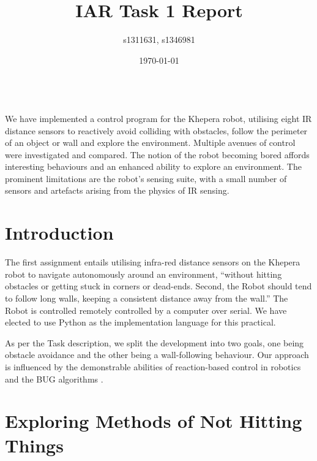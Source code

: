 \documentclass[11pt, a4paper]{article}
\renewenvironment{abstract}{%
{\mdseries\scshape\Large\abstractname}
\vspace{1em}\\
}{\par\noindent}
\begin{document}
\title{IAR Task 1 Report}
\author{s1311631, s1346981}
\date{\today}
\maketitle



\begin{abstract}
  We have implemented a control program for the Khepera robot, utilising eight IR distance
  sensors to reactively avoid colliding with obstacles, follow the perimeter of an object 
  or wall  and explore the environment. Multiple avenues of control were investigated and 
  compared. The notion of the robot becoming bored affords interesting behaviours and an 
  enhanced ability to explore an environment. The prominent limitations are the robot's 
  sensing suite, with a small number of sensors and artefacts arising from the physics 
  of IR sensing.
\end{abstract}



\section{Introduction}

The first assignment entails utilising infra-red distance sensors on the Khepera 
robot to navigate autonomously around an environment, ``without hitting obstacles 
or getting stuck in corners or dead-ends. Second, the Robot should tend to follow long walls, 
keeping a consistent distance away from the wall.'' The Robot is controlled remotely 
controlled by a computer over serial. We have elected to use Python as the 
implementation language for this practical.

As per the Task description, we split the development into two goals, one being obstacle 
avoidance and the other being a wall-following behaviour. Our approach is influenced 
by the demonstrable abilities of reaction-based control in robotics and the BUG 
algorithms \cite{principlesrobot}.



\section{Exploring Methods of Not Hitting Things}
\end{document}
